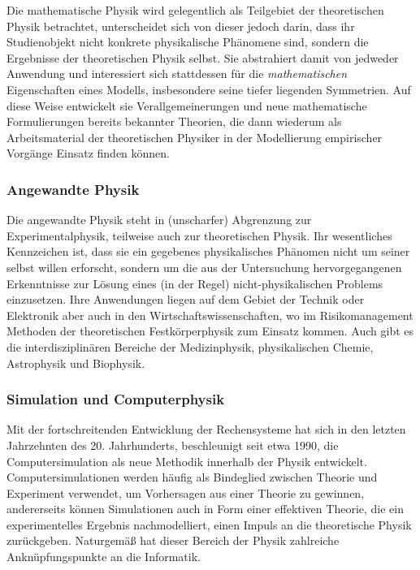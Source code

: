 \documentclass[titlepage, parkskip=full, twocolumn, landscape]{scrartcl}
\begin{document}
Die mathematische Physik wird gelegentlich als Teilgebiet der theoretischen Physik betrachtet, unterscheidet sich von dieser jedoch darin, dass ihr Studienobjekt nicht konkrete physikalische Phänomene sind, sondern die Ergebnisse der theoretischen Physik selbst. Sie abstrahiert damit von jedweder Anwendung und interessiert sich stattdessen für die \emph{mathematischen} Eigenschaften eines Modells, insbesondere seine tiefer liegenden Symmetrien. Auf diese Weise entwickelt sie Verallgemeinerungen und neue mathematische Formulierungen bereits bekannter Theorien, die dann wiederum als Arbeitsmaterial der theoretischen Physiker in der Modellierung empirischer Vorgänge Einsatz finden können.

\subsubsection{Angewandte Physik}

Die angewandte Physik steht in (unscharfer) Abgrenzung zur Experimentalphysik, teilweise auch zur theoretischen Physik. Ihr wesentliches Kennzeichen ist, dass sie ein gegebenes physikalisches Phänomen nicht um seiner selbst willen erforscht, sondern um die aus der Untersuchung hervorgegangenen Erkenntnisse zur Lösung eines (in der Regel) nicht-physikalischen Problems einzusetzen. Ihre Anwendungen liegen auf dem Gebiet der Technik oder Elektronik aber auch in den Wirtschaftswissenschaften, wo im Risikomanagement Methoden der theoretischen Festkörperphysik zum Einsatz kommen. Auch gibt es die interdisziplinären Bereiche der Medizinphysik, physikalischen Chemie, Astrophysik und Biophysik.

\subsubsection{Simulation und Computerphysik}

Mit der fortschreitenden Entwicklung der Rechensysteme hat sich in den letzten Jahrzehnten des 20. Jahrhunderts, beschleunigt seit etwa 1990, die Computersimulation als neue Methodik innerhalb der Physik entwickelt. Computersimulationen werden häufig als Bindeglied zwischen Theorie und Experiment verwendet, um Vorhersagen aus einer Theorie zu gewinnen, andererseits können Simulationen auch in Form einer effektiven Theorie, die ein experimentelles Ergebnis nachmodelliert, einen Impuls an die theoretische Physik zurückgeben. Naturgemäß hat dieser Bereich der Physik zahlreiche Anknüpfungspunkte an die Informatik.
\end{document}
